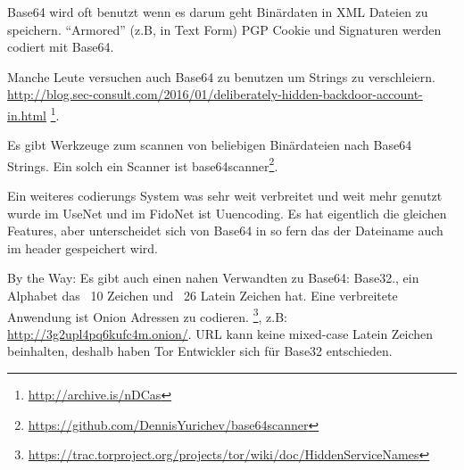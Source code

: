 Base64 wird oft benutzt wenn es darum geht Bin\"ardaten in  XML Dateien zu speichern.
``Armored'' (z.B, in Text Form) PGP Cookie und Signaturen werden codiert mit Base64.

Manche Leute versuchen auch Base64 zu benutzen um Strings zu verschleiern. 
\url{http://blog.sec-consult.com/2016/01/deliberately-hidden-backdoor-account-in.html}
\footnote{\url{http://archive.is/nDCas}}.

Es gibt Werkzeuge zum scannen von beliebigen Bin\"ardateien nach Base64 Strings.
Ein solch ein Scanner ist base64scanner\footnote{\url{https://github.com/DennisYurichev/base64scanner}}.

Ein weiteres codierungs System was sehr weit verbreitet und weit mehr genutzt wurde im UseNet und im 
FidoNet ist Uuencoding.
Es hat eigentlich die gleichen Features, aber unterscheidet sich von Base64 
in so fern das der Dateiname auch im header gespeichert wird.

By the Way: Es gibt auch einen nahen Verwandten zu Base64: Base32., ein Alphabet das ~10 Zeichen und ~26 Latein Zeichen hat. 
Eine verbreitete Anwendung ist Onion Adressen zu codieren. 
\footnote{\url{https://trac.torproject.org/projects/tor/wiki/doc/HiddenServiceNames}},
z.B: \url{http://3g2upl4pq6kufc4m.onion/}.
\ac{URL} kann keine mixed-case Latein Zeichen beinhalten, deshalb haben Tor Entwickler sich f\"ur Base32 entschieden.
